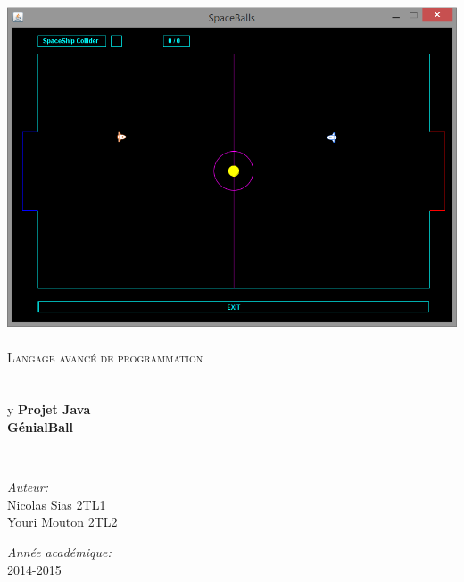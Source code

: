 \begin{titlepage}
\begin{center}

\includegraphics[width=15cm]{./TerrainAvecJoueur.png}~\\[1cm]

\textsc{\LARGE Langage avancé de programmation}\\[1.5cm]

\textsc{\Large }\\[0.5cm]

\HRule \\[0.4cm]
y
{\huge \bfseries Projet Java\\
GénialBall \\[0.4cm] }

\HRule \\[1.5cm]

\begin{minipage}{0.4\textwidth}
\begin{flushleft} \large
\emph{Auteur:}\\
Nicolas Sias 2TL1\\
Youri Mouton 2TL2
\end{flushleft}
\end{minipage}
\begin{minipage}{0.4\textwidth}
\begin{flushright} \large
\emph{Année académique:} \\
2014-2015
\end{flushright}
\end{minipage}

\vfill

\end{center}
\end{titlepage}